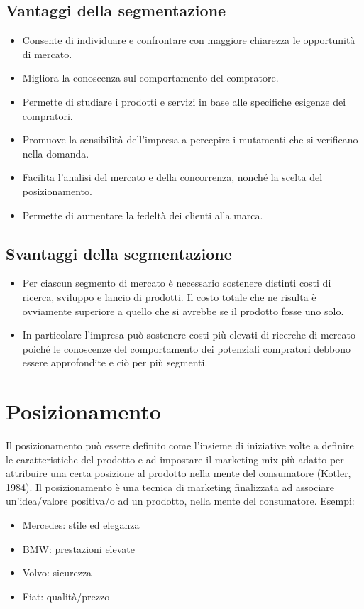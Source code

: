 \subsection{Vantaggi della segmentazione}
\begin{itemize}
	\item Consente di individuare e confrontare con maggiore chiarezza le opportunità di mercato.
	\item Migliora la conoscenza sul comportamento del compratore.
	\item Permette di studiare i prodotti e servizi in base alle specifiche esigenze dei compratori.
	\item Promuove la sensibilità dell’impresa a percepire i mutamenti che si verificano nella domanda.
	\item Facilita l’analisi del mercato e della concorrenza, nonché la scelta del posizionamento.
	\item Permette di aumentare la fedeltà dei clienti alla marca.
\end{itemize}

\subsection{Svantaggi della segmentazione}
\begin{itemize}
	\item Per ciascun segmento di mercato è necessario sostenere distinti costi di ricerca, sviluppo e lancio di prodotti. Il costo totale che ne risulta è ovviamente superiore a quello che si avrebbe se il prodotto fosse uno solo.
	\item In particolare l’impresa può sostenere costi più elevati di ricerche di mercato poiché le conoscenze del comportamento dei potenziali compratori debbono essere approfondite e ciò per più segmenti.
\end{itemize}

\section{Posizionamento}
Il posizionamento può essere definito come l’insieme di iniziative volte a definire le caratteristiche del prodotto e ad impostare il marketing mix più adatto per attribuire una certa posizione al prodotto nella mente del consumatore (Kotler, 1984). \newline
Il posizionamento è una tecnica di marketing finalizzata ad associare un’idea/valore positiva/o ad un prodotto, nella mente del consumatore. \newline
{\Large Esempi:}
\begin{itemize}
	\item Mercedes: stile ed eleganza
	\item BMW: prestazioni elevate
	\item Volvo: sicurezza
	\item Fiat: qualità/prezzo
\end{itemize}
	
